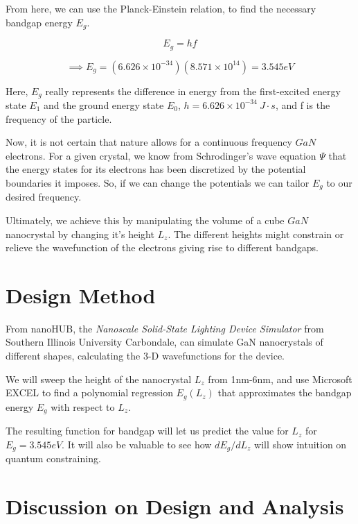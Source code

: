 \documentclass{IEEEtran}
\begin{document}
From here, we can use the Planck-Einstein relation, to find the necessary bandgap energy \(E_g\).

\begin{equation}
    E_g = hf
\end{equation}

\begin{equation*}
    \implies E_g = (6.626 \times 10^{-34})(8.571 \times 10^{14}) = 3.545 eV
\end{equation*}

Here, \(E_g\) really represents the difference in energy from the first-excited energy state \(E_1\) and the ground energy state \(E_0\), \(h = 6.626 \times 10^{-34} ~ J\cdot s\), and f is the frequency of the particle.

Now, it is not certain that nature allows for a continuous frequency \(GaN\) electrons. For a given crystal, we know from Schrodinger's wave equation \(\Psi\) that the energy states for its electrons has been discretized by the potential boundaries it imposes. So, if we can change the potentials we can tailor \(E_g\) to our desired frequency.

Ultimately, we achieve this by manipulating the volume of a cube \(GaN\) nanocrystal by changing it's height \(L_z\). The different heights might constrain or relieve the wavefunction of the electrons giving rise to different bandgaps.


\section{Design Method}

From nanoHUB, the \textit{Nanoscale Solid-State Lighting Device Simulator} \cite{simulator} from Southern Illinois University Carbondale, can simulate GaN nanocrystals of different shapes, calculating the 3-D wavefunctions for the device.

We will sweep the height of the nanocrystal \(L_z\) from 1nm-6nm, and use Microsoft EXCEL to find a polynomial regression \(E_g(L_z)\) that approximates the bandgap energy \(E_g\) with respect to \(L_z\).

The resulting function for bandgap will let us predict the value for \(L_z\) for \(E_g = 3.545eV\). It will also be valuable to see how \(dE_g / dL_z\) will show intuition on quantum constraining.

\section{Discussion on Design and Analysis}
\end{document}
